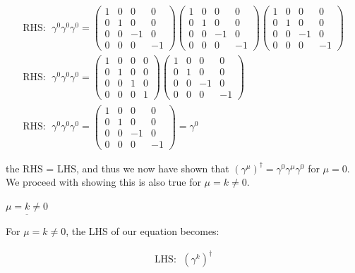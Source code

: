 \documentclass[11pt]{article}
\theoremstyle{definition}
\begin{document}
\begin{align*}
    \text{RHS: }\; \gamma^{0}\gamma^{0}\gamma^{0} = 
    \begin{pmatrix}1&0&0&0\\ 0&1&0&0\\ 0&0&-1&0\\ 0&0&0&-1\end{pmatrix}
    \begin{pmatrix}1&0&0&0\\ 0&1&0&0\\ 0&0&-1&0\\ 0&0&0&-1\end{pmatrix}
    \begin{pmatrix}1&0&0&0\\ 0&1&0&0\\ 0&0&-1&0\\ 0&0&0&-1\end{pmatrix}\\
    \text{RHS: }\; \gamma^{0}\gamma^{0}\gamma^{0} =
    \begin{pmatrix}1&0&0&0\\ 0&1&0&0\\ 0&0&1&0\\ 0&0&0&1\end{pmatrix}
    \begin{pmatrix}1&0&0&0\\ 0&1&0&0\\ 0&0&-1&0\\ 0&0&0&-1\end{pmatrix}\\
    \text{RHS: }\; \gamma^{0}\gamma^{0}\gamma^{0} =
    \begin{pmatrix}1&0&0&0\\ 0&1&0&0\\ 0&0&-1&0\\ 0&0&0&-1\end{pmatrix} = \gamma^{0}
\end{align*}

the RHS = LHS, and thus we now have shown that $(\gamma^{\mu})^{\dagger} = \gamma^{0} \gamma^{\mu} \gamma^{0}$ for $\mu=0$. We proceed with showing this is also true for $\mu=k\neq 0$.\newline


$\underline{\mu=k\neq 0}$

For $\mu=k \neq 0$, the LHS of our equation becomes:

\begin{align*}
    \text{LHS: }\; (\gamma^{k})^{\dagger}
\end{align*}
\end{document}
